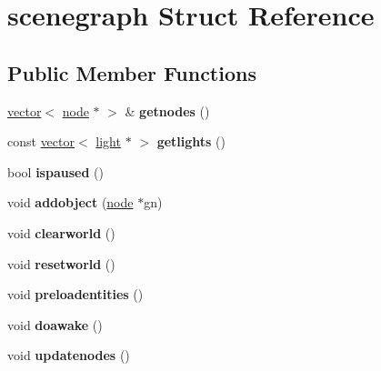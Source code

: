 \hypertarget{structscenegraph}{}\section{scenegraph Struct Reference}
\label{structscenegraph}
\subsection*{Public Member Functions}
\begin{DoxyCompactItemize}
\item 
\mbox{\label{structscenegraph_a1ad0340322337612af630cd054178cb8}} 
\hyperlink{structvector}{vector}$<$ \hyperlink{structnode}{node} $\ast$ $>$ \& {\bfseries getnodes} ()
\item 
\mbox{\label{structscenegraph_a67b9e2eb239f0f4ff2a34d577299e157}} 
const \hyperlink{structvector}{vector}$<$ \hyperlink{structlight}{light} $\ast$ $>$ {\bfseries getlights} ()
\item 
\mbox{\label{structscenegraph_aacaa72e836b710f11531158403fe4c2a}} 
bool {\bfseries ispaused} ()
\item 
\mbox{\label{structscenegraph_af84aee97286584e157bb701ecd0ccec3}} 
void {\bfseries addobject} (\hyperlink{structnode}{node} $\ast$gn)
\item 
\mbox{\label{structscenegraph_a393ef1b347490d3cc7209bde8819f4f5}} 
void {\bfseries clearworld} ()
\item 
\mbox{\label{structscenegraph_a62d9191104061308e97d7dbfefd9eb73}} 
void {\bfseries resetworld} ()
\item 
\mbox{\label{structscenegraph_a5289946c9e09528412f6db37c2cdf330}} 
void {\bfseries preloadentities} ()
\item 
\mbox{\label{structscenegraph_a63672a4ee8488885d9c7dae90bc35695}} 
void {\bfseries doawake} ()
\item 
\mbox{\label{structscenegraph_a6aef1c5c6222bb3dd56d6a55ea118e8b}} 
void {\bfseries updatenodes} ()

\end{DoxyCompactItemize}
